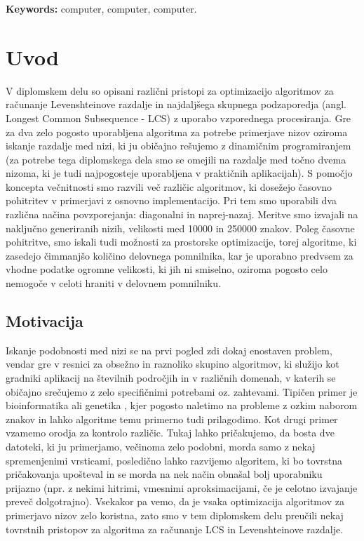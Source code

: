 \documentclass[a4paper,12pt,openright]{book}
\newcommand{\tkeywordsEn}{computer, computer, computer}
\newcommand{\clearemptydoublepage}{\newpage{\pagestyle{empty}\cleardoublepage}}
\begin{document}
\bigskip

\noindent\textbf{Keywords:} \tkeywordsEn.
\clearemptydoublepage

\mainmatter
\setcounter{page}{1}
\pagestyle{fancy}

\chapter{Uvod}

V diplomskem delu so opisani različni pristopi za optimizacijo algoritmov za računanje Levenshteinove razdalje in najdaljšega skupnega podzaporedja (angl. Longest Common Subsequence - LCS) z uporabo vzporednega procesiranja. Gre za dva zelo pogosto uporabljena algoritma za potrebe primerjave nizov oziroma iskanje razdalje med nizi, ki ju običajno rešujemo z dinamičnim programiranjem (za potrebe tega diplomskega dela smo se omejili na razdalje med točno dvema nizoma, ki je tudi najpogosteje uporabljena v praktičnih aplikacijah). S pomočjo koncepta večnitnosti smo razvili več različic algoritmov, ki dosežejo časovno pohitritev v primerjavi z osnovno implementacijo. Pri tem smo uporabili dva različna načina povzporejanja: diagonalni in naprej-nazaj. Meritve smo izvajali na naključno generiranih nizih, velikosti med 10000 in 250000 znakov. Poleg časovne pohitritve, smo iskali tudi možnosti za prostorske optimizacije, torej algoritme, ki zasedejo čimmanjšo količino delovnega pomnilnika, kar je uporabno predvsem za vhodne podatke ogromne velikosti, ki jih ni smiselno, oziroma pogosto celo nemogoče v celoti hraniti v delovnem pomnilniku. 

\section{Motivacija}

Iskanje podobnosti med nizi se na prvi pogled zdi dokaj enostaven problem, vendar gre v resnici za obsežno in raznoliko skupino algoritmov, ki služijo kot gradniki aplikacij na številnih področjih in v različnih domenah, v katerih se običajno srečujemo z zelo specifičnimi potrebami oz. zahtevami. Tipičen primer je bioinformatika ali genetika \cite{LCSpracticalUse}, kjer pogosto naletimo na probleme z ozkim naborom znakov in lahko algoritme temu primerno tudi prilagodimo. Kot drugi primer vzamemo orodja za kontrolo različic. Tukaj lahko pričakujemo, da bosta dve datoteki, ki ju primerjamo, večinoma zelo podobni, morda samo z nekaj spremenjenimi vrsticami, posledično lahko razvijemo algoritem, ki bo tovrstna pričakovanja upošteval in se morda na nek način obnašal bolj uporabniku prijazno (npr. z nekimi hitrimi, vmesnimi aproksimacijami, če je celotno izvajanje preveč dolgotrajno). Vsekakor pa vemo, da je vsaka optimizacija algoritmov za primerjavo nizov zelo koristna, zato smo v tem diplomskem delu preučili nekaj tovrstnih pristopov za algoritma za računanje LCS in Levenshteinove razdalje. 
\end{document}
